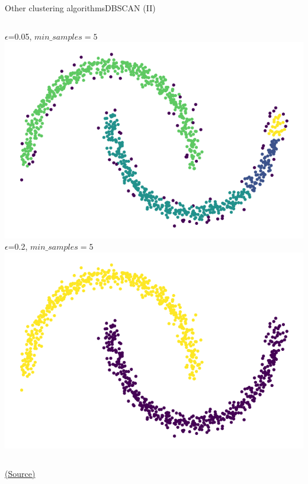 \documentclass[10pt,compress]{beamer} %
\begin{document}
\begin{frame}{Other clustering algorithms}{DBSCAN (II)}
    \begin{columns}
        \centering $\epsilon$=0.05, $min\_samples=5$\\
	    \includegraphics[width=\textwidth]{figs/dbscan1.png}\\
        
       \centering $\epsilon$=0.2, $min\_samples=5$\\
	   \includegraphics[width=\textwidth]{figs/dbscan2.png}\\
    \end{columns}
    \centering \tiny{\href{https://github.com/Akramz/Hands-on-Machine-Learning-with-Scikit-Learn-Keras-and-TensorFlow/blob/master/09.Unsupervised_learning.ipynb}{(Source)}}
\end{frame}
\end{document}
